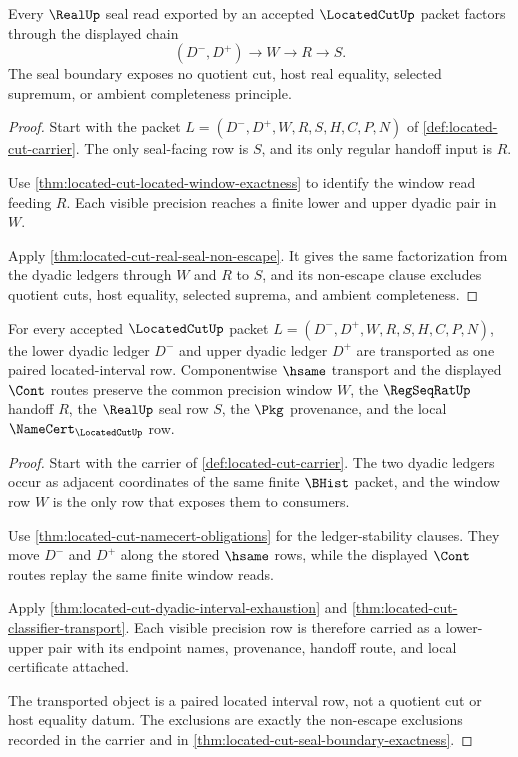 \begin{theorem}
\label{thm:located-cut-seal-boundary-exactness}
Every $\RealUp$ seal read exported by an accepted
$\LocatedCutUp$ packet factors through the displayed chain
$$
(D^{-},D^{+}) \longrightarrow W \longrightarrow R \longrightarrow S.
$$
The seal boundary exposes no quotient cut, host real equality, selected
supremum, or ambient completeness principle.
\end{theorem}
\begin{proof}
Start with the packet $L=(D^{-},D^{+},W,R,S,H,C,P,N)$ of
\autoref{def:located-cut-carrier}. The only seal-facing row is $S$, and its
only regular handoff input is $R$.

Use \autoref{thm:located-cut-located-window-exactness} to identify the window
read feeding $R$. Each visible precision reaches a finite lower and upper
dyadic pair in $W$.

Apply \autoref{thm:located-cut-real-seal-non-escape}. It gives the same
factorization from the dyadic ledgers through $W$ and $R$ to $S$, and its
non-escape clause excludes quotient cuts, host equality, selected suprema, and
ambient completeness.
\end{proof}

\begin{theorem}
\label{thm:located-cut-ledger-pair-coherence}
For every accepted $\LocatedCutUp$ packet $L=(D^{-},D^{+},W,R,S,H,C,P,N)$,
the lower dyadic ledger $D^{-}$ and upper dyadic ledger $D^{+}$ are transported
as one paired located-interval row. Componentwise $\hsame$ transport and the
displayed $\Cont$ routes preserve the common precision window $W$, the
$\RegSeqRatUp$ handoff $R$, the $\RealUp$ seal row $S$, the $\Pkg$ provenance,
and the local $\NameCert_{\LocatedCutUp}$ row.
\end{theorem}
\begin{proof}
Start with the carrier of \autoref{def:located-cut-carrier}. The two dyadic
ledgers occur as adjacent coordinates of the same finite $\BHist$ packet, and
the window row $W$ is the only row that exposes them to consumers.

Use \autoref{thm:located-cut-namecert-obligations} for the ledger-stability
clauses. They move $D^{-}$ and $D^{+}$ along the stored $\hsame$ rows, while
the displayed $\Cont$ routes replay the same finite window reads.

Apply \autoref{thm:located-cut-dyadic-interval-exhaustion} and
\autoref{thm:located-cut-classifier-transport}. Each visible precision row is
therefore carried as a lower-upper pair with its endpoint names, provenance,
handoff route, and local certificate attached.

The transported object is a paired located interval row, not a quotient cut or
host equality datum. The exclusions are exactly the non-escape exclusions
recorded in the carrier and in \autoref{thm:located-cut-seal-boundary-exactness}.
\end{proof}

